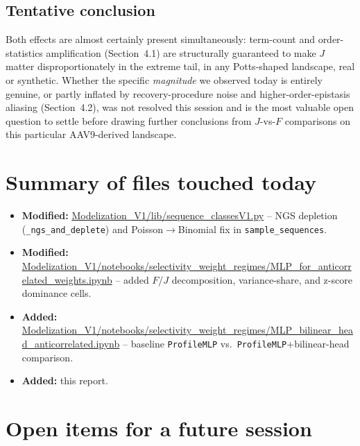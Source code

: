 \documentclass[11pt]{article}
\newcommand{\code}[1]{\texttt{#1}}
\begin{document}
\subsection{Tentative conclusion}

Both effects are almost certainly present simultaneously: term-count and order-statistics
amplification (Section~4.1) are structurally guaranteed to make $J$ matter disproportionately in
the extreme tail, in any Potts-shaped landscape, real or synthetic. Whether the specific
\emph{magnitude} we observed today is entirely genuine, or partly inflated by recovery-procedure
noise and higher-order-epistasis aliasing (Section~4.2), was not resolved this session and is the
most valuable open question to settle before drawing further conclusions from
$J$-vs-$F$ comparisons on this particular AAV9-derived landscape.

\section{Summary of files touched today}

\begin{itemize}
  \item \textbf{Modified:} \url{Modelization_V1/lib/sequence_classesV1.py} -- NGS depletion
        (\code{\_ngs\_and\_deplete}) and Poisson$\to$Binomial fix in \code{sample\_sequences}.
  \item \textbf{Modified:}
        \url{Modelization_V1/notebooks/selectivity_weight_regimes/MLP_for_anticorrelated_weights.ipynb}
        -- added $F$/$J$ decomposition, variance-share, and z-score dominance cells.
  \item \textbf{Added:}
        \url{Modelization_V1/notebooks/selectivity_weight_regimes/MLP_bilinear_head_anticorrelated.ipynb}
        -- baseline \code{ProfileMLP} vs.\ \code{ProfileMLP}+bilinear-head comparison.
  \item \textbf{Added:} this report.
\end{itemize}

\section{Open items for a future session}
\end{document}
